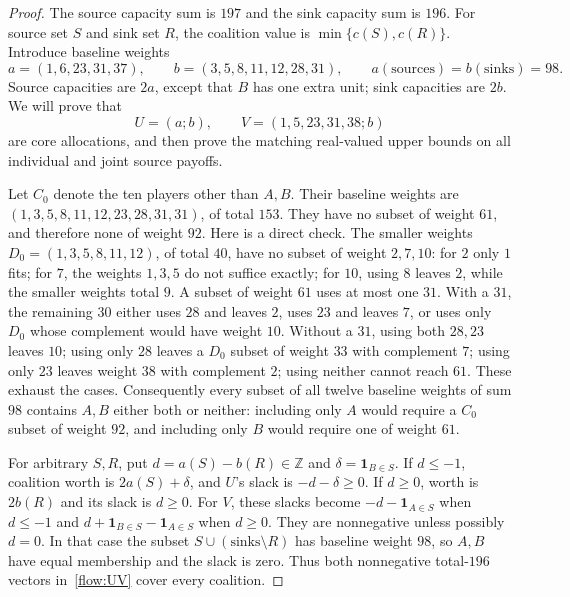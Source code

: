 \begin{proof}
The source capacity sum is $197$ and the sink capacity sum is $196$.
For source set $S$ and sink set $R$, the coalition value is
$\min\{c(S),c(R)\}$. Introduce baseline weights
\[
 a=(1,6,23,31,37),\qquad b=(3,5,8,11,12,28,31),
                  \qquad a(\mathrm{sources})=b(\mathrm{sinks})=98.
\]
Source capacities are $2a$, except that $B$ has one extra unit; sink
capacities are $2b$. We will prove that
\begin{equation}\label{flow:UV}
         U=(a;b),\qquad V=(1,5,23,31,38;b)
\end{equation}
are core allocations, and then prove the matching real-valued upper
bounds on all individual and joint source payoffs.

Let $C_0$ denote the ten players other than $A,B$. Their baseline
weights are $(1,3,5,8,11,12,23,28,31,31)$, of total $153$.
They have no subset of weight $61$, and therefore none of weight $92$.
Here is a direct check. The smaller weights
$D_0=(1,3,5,8,11,12)$, of total $40$, have no subset of weight
$2,7,10$: for $2$ only $1$ fits; for $7$, the weights $1,3,5$ do
not suffice exactly; for $10$, using $8$ leaves $2$, while the smaller
weights total $9$. A subset of weight $61$ uses at most one $31$.
With a $31$, the remaining $30$ either uses $28$ and leaves $2$, uses
$23$ and leaves $7$, or uses only $D_0$ whose complement would have
weight $10$. Without a $31$, using both $28,23$ leaves $10$; using
only $28$ leaves a $D_0$ subset of weight $33$ with complement $7$;
using only $23$ leaves weight $38$ with complement $2$; using neither
cannot reach $61$. These exhaust the cases. Consequently every subset
of all twelve baseline weights of sum $98$ contains $A,B$ either both
or neither: including only $A$ would require a $C_0$ subset of weight
$92$, and including only $B$ would require one of weight $61$.

For arbitrary $S,R$, put $d=a(S)-b(R)\in\mathbb Z$ and
$\delta=\mathbf1_{B\in S}$. If $d\le-1$, coalition worth is
$2a(S)+\delta$, and $U$'s slack is $-d-\delta\ge0$.
If $d\ge0$, worth is $2b(R)$ and its slack is $d\ge0$.
For $V$, these slacks become $-d-\mathbf1_{A\in S}$ when $d\le-1$
and $d+\mathbf1_{B\in S}-\mathbf1_{A\in S}$ when $d\ge0$.
They are nonnegative unless possibly $d=0$. In that case the subset
$S\cup(\mathrm{sinks}\setminus R)$ has baseline weight $98$,
so $A,B$ have equal membership and the slack is zero.
Thus both nonnegative total-$196$ vectors in~\eqref{flow:UV} cover
every coalition.


\end{proof}
